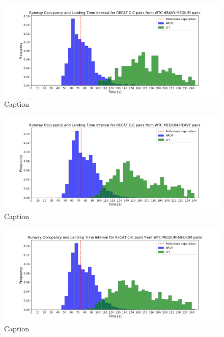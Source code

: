\begin{figure}[h]
    \centering
    \includegraphics[width=1\textwidth]{graphics/fig_CC_from_HM_pairs_time_sep.png}
    \caption[list of figures caption]{Caption}
    \label{fig:CC_from_HM_pairs_time_sep}
\end{figure}

\begin{figure}[h]
    \centering
    \includegraphics[width=1\textwidth]{graphics/fig_CC_from_MH_pairs_time_sep.png}
    \caption[list of figures caption]{Caption}
    \label{fig:CC_from_MH_pairs_time_sep}
\end{figure}

\begin{figure}[h]
    \centering
    \includegraphics[width=1\textwidth]{graphics/fig_CC_from_MM_pairs_time_sep.png}
    \caption[list of figures caption]{Caption}
    \label{fig:CC_from_MM_pairs_time_sep}
\end{figure}

